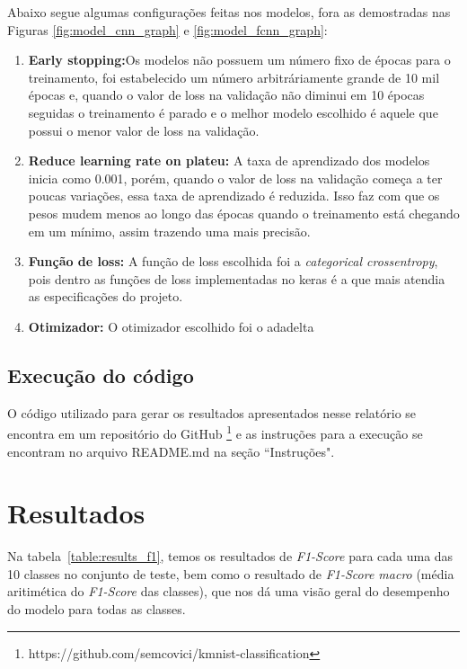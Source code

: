 \documentclass[12pt]{article}
\begin{document}
Abaixo segue algumas configurações feitas nos modelos, fora as demostradas nas Figuras \ref{fig:model_cnn_graph} e \ref{fig:model_fcnn_graph}:

\begin{enumerate}
  \item \textbf{Early stopping:}Os modelos não possuem um número fixo de épocas para o treinamento, foi estabelecido um número arbitráriamente grande de 10 mil épocas e, quando o valor de loss na validação não diminui em 10 épocas seguidas o treinamento é parado e o melhor modelo escolhido é aquele que possui o menor valor de loss na validação. 
  \item \textbf{Reduce learning rate on plateu:} A taxa de aprendizado dos modelos inicia como 0.001, porém, quando o valor de loss na validação começa a ter poucas variações, essa taxa de aprendizado é reduzida. Isso faz com que os pesos mudem menos ao longo das épocas quando o treinamento está chegando em um mínimo, assim trazendo uma mais precisão. 
  \item \textbf{Função de loss:} A função de loss escolhida foi a \textit{categorical crossentropy}, pois dentro as funções de loss implementadas no keras é a que mais atendia as especificações do projeto.
  \item \textbf{Otimizador:} O otimizador escolhido foi o adadelta
\end{enumerate}


\subsection{Execução do código}

O código utilizado para gerar os resultados apresentados nesse relatório se encontra em um repositório do GitHub \footnote{https://github.com/semcovici/kmnist-classification} e as instruções para a execução se encontram no arquivo README.md na seção ``Instruções".


\section{Resultados}

Na tabela~\ref{table:results_f1}, temos os resultados de \textit{F1-Score} para cada uma das 10 classes no conjunto de teste, bem como o resultado de \textit{F1-Score macro} (média aritimética do \textit{F1-Score} das classes), que nos dá uma visão geral do desempenho do modelo para todas as classes.
\end{document}
